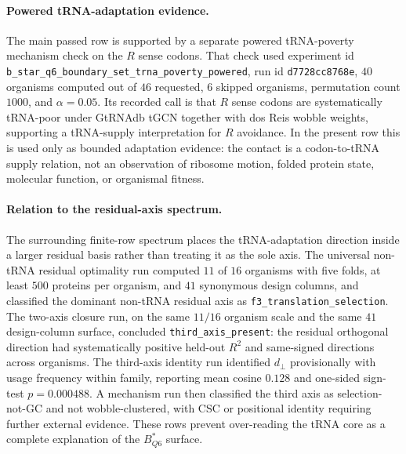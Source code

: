 \paragraph{Powered tRNA-adaptation evidence.}
The main passed row is supported by a separate powered tRNA-poverty mechanism check on the $R$ sense codons. That check used experiment id \texttt{b\_star\_q6\_boundary\_set\_trna\_poverty\_powered}, run id \texttt{d7728cc8768e}, $40$ organisms computed out of $46$ requested, $6$ skipped organisms, permutation count $1000$, and $\alpha=0.05$. Its recorded call is that $R$ sense codons are systematically tRNA-poor under GtRNAdb tGCN together with dos Reis wobble weights, supporting a tRNA-supply interpretation for $R$ avoidance. In the present row this is used only as bounded adaptation evidence: the contact is a codon-to-tRNA supply relation, not an observation of ribosome motion, folded protein state, molecular function, or organismal fitness.

\paragraph{Relation to the residual-axis spectrum.}
The surrounding finite-row spectrum places the tRNA-adaptation direction inside a larger residual basis rather than treating it as the sole axis. The universal non-tRNA residual optimality run computed $11$ of $16$ organisms with five folds, at least $500$ proteins per organism, and $41$ synonymous design columns, and classified the dominant non-tRNA residual axis as \texttt{f3\_translation\_selection}. The two-axis closure run, on the same $11/16$ organism scale and the same $41$ design-column surface, concluded \texttt{third\_axis\_present}: the residual orthogonal direction had systematically positive held-out $R^2$ and same-signed directions across organisms. The third-axis identity run identified $d_\perp$ provisionally with usage frequency within family, reporting mean cosine $0.128$ and one-sided sign-test $p=0.000488$. A mechanism run then classified the third axis as selection-not-GC and not wobble-clustered, with CSC or positional identity requiring further external evidence. These rows prevent over-reading the tRNA core as a complete explanation of the $B^*_{Q6}$ surface.

